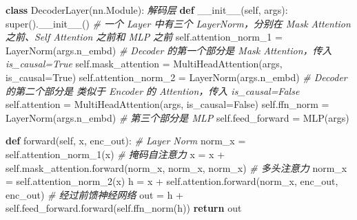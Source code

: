 \documentclass[
]{article}
\newenvironment{Shaded}{}{}
\newcommand{\BuiltInTok}[1]{\textcolor[rgb]{0.00,0.50,0.00}{#1}}
\newcommand{\CommentTok}[1]{\textcolor[rgb]{0.38,0.63,0.69}{\textit{#1}}}
\newcommand{\ControlFlowTok}[1]{\textcolor[rgb]{0.00,0.44,0.13}{\textbf{#1}}}
\newcommand{\FunctionTok}[1]{\textcolor[rgb]{0.02,0.16,0.49}{#1}}
\newcommand{\KeywordTok}[1]{\textcolor[rgb]{0.00,0.44,0.13}{\textbf{#1}}}
\newcommand{\NormalTok}[1]{#1}
\newcommand{\OperatorTok}[1]{\textcolor[rgb]{0.40,0.40,0.40}{#1}}
\newcommand{\VariableTok}[1]{\textcolor[rgb]{0.10,0.09,0.49}{#1}}
\begin{document}
\begin{Shaded}
\begin{Highlighting}[]
\KeywordTok{class}\NormalTok{ DecoderLayer(nn.Module):}
  \CommentTok{\textquotesingle{}\textquotesingle{}\textquotesingle{}解码层\textquotesingle{}\textquotesingle{}\textquotesingle{}}
    \KeywordTok{def} \FunctionTok{\_\_init\_\_}\NormalTok{(}\VariableTok{self}\NormalTok{, args):}
        \BuiltInTok{super}\NormalTok{().}\FunctionTok{\_\_init\_\_}\NormalTok{()}
        \CommentTok{\# 一个 Layer 中有三个 LayerNorm，分别在 Mask Attention 之前、Self Attention 之前和 MLP 之前}
        \VariableTok{self}\NormalTok{.attention\_norm\_1 }\OperatorTok{=}\NormalTok{ LayerNorm(args.n\_embd)}
        \CommentTok{\# Decoder 的第一个部分是 Mask Attention，传入 is\_causal=True}
        \VariableTok{self}\NormalTok{.mask\_attention }\OperatorTok{=}\NormalTok{ MultiHeadAttention(args, is\_causal}\OperatorTok{=}\VariableTok{True}\NormalTok{)}
        \VariableTok{self}\NormalTok{.attention\_norm\_2 }\OperatorTok{=}\NormalTok{ LayerNorm(args.n\_embd)}
        \CommentTok{\# Decoder 的第二个部分是 类似于 Encoder 的 Attention，传入 is\_causal=False}
        \VariableTok{self}\NormalTok{.attention }\OperatorTok{=}\NormalTok{ MultiHeadAttention(args, is\_causal}\OperatorTok{=}\VariableTok{False}\NormalTok{)}
        \VariableTok{self}\NormalTok{.ffn\_norm }\OperatorTok{=}\NormalTok{ LayerNorm(args.n\_embd)}
        \CommentTok{\# 第三个部分是 MLP}
        \VariableTok{self}\NormalTok{.feed\_forward }\OperatorTok{=}\NormalTok{ MLP(args)}

    \KeywordTok{def}\NormalTok{ forward(}\VariableTok{self}\NormalTok{, x, enc\_out):}
        \CommentTok{\# Layer Norm}
\NormalTok{        norm\_x }\OperatorTok{=} \VariableTok{self}\NormalTok{.attention\_norm\_1(x)}
        \CommentTok{\# 掩码自注意力}
\NormalTok{        x }\OperatorTok{=}\NormalTok{ x }\OperatorTok{+} \VariableTok{self}\NormalTok{.mask\_attention.forward(norm\_x, norm\_x, norm\_x)}
        \CommentTok{\# 多头注意力}
\NormalTok{        norm\_x }\OperatorTok{=} \VariableTok{self}\NormalTok{.attention\_norm\_2(x)}
\NormalTok{        h }\OperatorTok{=}\NormalTok{ x }\OperatorTok{+} \VariableTok{self}\NormalTok{.attention.forward(norm\_x, enc\_out, enc\_out)}
        \CommentTok{\# 经过前馈神经网络}
\NormalTok{        out }\OperatorTok{=}\NormalTok{ h }\OperatorTok{+} \VariableTok{self}\NormalTok{.feed\_forward.forward(}\VariableTok{self}\NormalTok{.ffn\_norm(h))}
        \ControlFlowTok{return}\NormalTok{ out}
\end{Highlighting}
\end{Shaded}
\end{document}

